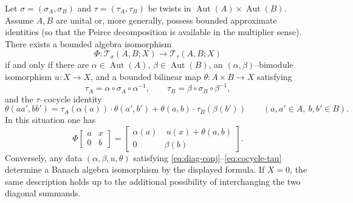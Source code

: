 \documentclass[10pt,a4paper]{amsart}
\newcommand{\Aut}{\operatorname{Aut}}
\newcommand{\T}{\mathcal{T}}
\begin{document}
\begin{theorem}\label{thm:iso}
Let \(\sigma=(\sigma_A,\sigma_B)\) and \(\tau=(\tau_A,\tau_B)\) be twists in \(\Aut(A)\times\Aut(B)\).
Assume \(A,B\) are unital or, more generally, possess bounded approximate identities (so that the Peirce decomposition is available in the multiplier sense).
There exists a bounded algebra isomorphism
\[
\Phi:\T_\sigma(A,B;X)\longrightarrow \T_\tau(A,B;X)
\]
if and only if there are \(\alpha\in\Aut(A)\), \(\beta\in\Aut(B)\), an \((\alpha,\beta)\)--bimodule isomorphism \(u:X\to X\), and a bounded bilinear map \(\theta:A\times B\to X\) satisfying
\begin{equation}\label{eq:diag-conj}
\tau_A=\alpha\circ \sigma_A\circ \alpha^{-1},
\qquad
\tau_B=\beta\circ \sigma_B\circ \beta^{-1},
\end{equation}
and the \(\tau\)--cocycle identity
\begin{equation}\label{eq:cocycle-tau}
\theta(aa',bb')=\tau_A(\alpha(a))\cdot \theta(a',b')+\theta(a,b)\cdot \tau_B(\beta(b'))
\qquad(a,a'\in A,\ b,b'\in B).
\end{equation}
In this situation one has
\[
\Phi\!\begin{bmatrix}a&x\\[2pt]0&b\end{bmatrix}
=
\begin{bmatrix}\alpha(a)&\ u(x)+\theta(a,b)\\[2pt]0&\beta(b)\end{bmatrix}.
\]
Conversely, any data \((\alpha,\beta,u,\theta)\) satisfying \eqref{eq:diag-conj}--\eqref{eq:cocycle-tau} determine a Banach algebra isomorphism by the displayed formula.
If \(X=0\), the same description holds up to the additional possibility of interchanging the two diagonal summands.
\end{theorem}
\end{document}
